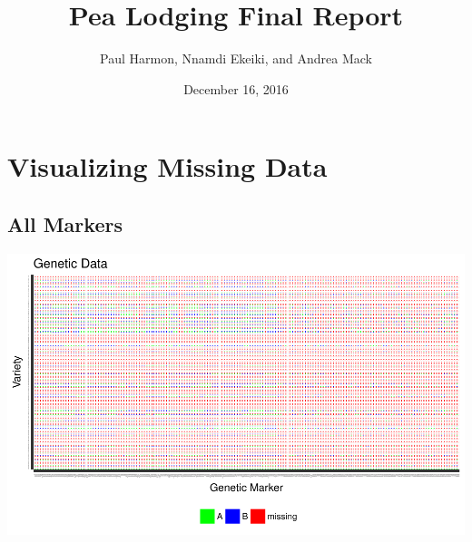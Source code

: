 \documentclass[11pt]{article}\usepackage[]{graphicx}\usepackage[]{color}
\title{Pea Lodging Final Report}
\author{Paul Harmon, Nnamdi Ekeiki, and Andrea Mack}
\date{December 16, 2016}
\makeatletter
\def\maxwidth{ %
  \ifdim\Gin@nat@width>\linewidth
    \linewidth
  \else
    \Gin@nat@width
  \fi
}
\newenvironment{knitrout}{}{} %
\makeatother
\begin{document}
\maketitle





\section{Visualizing Missing Data}
\subsection{All Markers}

\begin{knitrout}\footnotesize
{}\color{fgcolor}

{\centering \includegraphics[width=\maxwidth]{figure/missing_plot-1} 

}



\end{knitrout}
\end{document}

